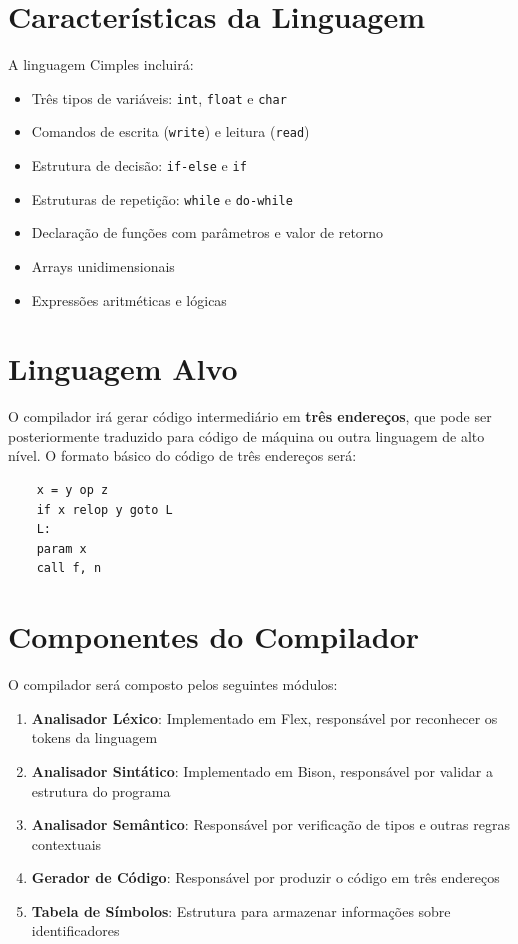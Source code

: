 \documentclass[10pt, a4paper]{article}
\begin{document}
\section{Características da Linguagem}

A linguagem Cimples incluirá:

\begin{itemize}
    \item Três tipos de variáveis: \texttt{int}, \texttt{float} e \texttt{char}
    \item Comandos de escrita (\texttt{write}) e leitura (\texttt{read})
    \item Estrutura de decisão: \texttt{if-else} e \texttt{if}
    \item Estruturas de repetição: \texttt{while} e \texttt{do-while}
    \item Declaração de funções com parâmetros e valor de retorno
    \item Arrays unidimensionais
    \item Expressões aritméticas e lógicas
\end{itemize}

\section{Linguagem Alvo}

O compilador irá gerar código intermediário em \textbf{três endereços}, 
que pode ser posteriormente traduzido para código de máquina ou outra 
linguagem de alto nível. O formato básico do código de três endereços será:

\begin{verbatim}
    x = y op z
    if x relop y goto L
    L:
    param x
    call f, n
\end{verbatim}

\section{Componentes do Compilador}

O compilador será composto pelos seguintes módulos:

\begin{enumerate}
    \item \textbf{Analisador Léxico}: 
    Implementado em Flex, responsável por reconhecer os tokens da linguagem
    \item \textbf{Analisador Sintático}: 
    Implementado em Bison, responsável por validar a estrutura do programa
    \item \textbf{Analisador Semântico}: 
    Responsável por verificação de tipos e outras regras contextuais
    \item \textbf{Gerador de Código}: 
    Responsável por produzir o código em três endereços
    \item \textbf{Tabela de Símbolos}: 
    Estrutura para armazenar informações sobre identificadores
\end{enumerate}
\end{document}
